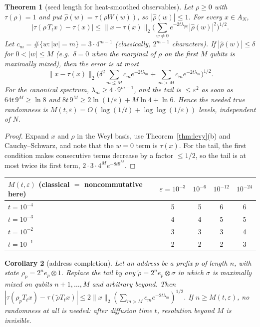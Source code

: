 \documentclass[11pt]{article}
\newtheorem{theorem}{Theorem}[section]
\newtheorem{corollary}[theorem]{Corollary}
\theoremstyle{definition}
\theoremstyle{remark}
\newcommand{\dep}[1]{|#1|}
\begin{document}
\begin{theorem}[seed length for heat-smoothed observables]\label{thm:seedlen}
Let $\rho\ge0$ with $\tau(\rho)=1$ and put $\hat\rho(w)=\tau(\rho W(w))$, so $|\hat\rho(w)|\le1$. For every $x\in A_N$,
\[|\tau(\rho\,T_tx)-\tau(x)|\le\|x-\tau(x)\|_2\Big(\sum_{w\ne0}e^{-2t\lambda_{\dep w}}|\hat\rho(w)|^2\Big)^{1/2}.\]
Let $c_m=\#\{w:\dep w=m\}=3\cdot4^{m-1}$ (classically, $2^{m-1}$ characters). If $|\hat\rho(w)|\le\delta$ for $0<\dep w\le M$ (e.g.\ $\delta=0$ when the marginal of $\rho$ on the first $M$ qubits is maximally mixed), then the error is at most
\[\|x-\tau(x)\|_2\Big(\delta^2\textstyle\sum_{m\le M}c_me^{-2t\lambda_m}+\sum_{m>M}c_me^{-2t\lambda_m}\Big)^{1/2}.\]
For the canonical spectrum, $\lambda_m\ge4\cdot9^{m-1}$, and the tail is $\le\varepsilon^2$ as soon as $64t\,9^M\ge\ln8$ and $8t\,9^M\ge2\ln(1/\varepsilon)+M\ln4+\ln6$. Hence the needed true randomness is $M(t,\varepsilon)=O(\log(1/t)+\log\log(1/\varepsilon))$ levels, \emph{independent of $N$}.
\end{theorem}

\begin{proof}
Expand $x$ and $\rho$ in the Weyl basis, use Theorem~\ref{thm:levy}(b) and Cauchy--Schwarz, and note that the $w=0$ term is $\tau(x)$. For the tail, the first condition makes consecutive terms decrease by a factor $\le1/2$, so the tail is at most twice its first term, $2\cdot3\cdot4^Me^{-8t9^M}$.
\end{proof}

\begin{center}
\begin{tabular}{lcccc}
\toprule
$M(t,\varepsilon)$ (classical $=$ noncommutative here) & $\varepsilon=10^{-3}$ & $10^{-6}$ & $10^{-12}$ & $10^{-24}$\\
\midrule
$t=10^{-4}$ & 5 & 5 & 6 & 6\\
$t=10^{-3}$ & 4 & 4 & 5 & 5\\
$t=10^{-2}$ & 3 & 3 & 3 & 4\\
$t=10^{-1}$ & 2 & 2 & 2 & 3\\
\bottomrule
\end{tabular}
\end{center}

\begin{corollary}[address completion]
Let an \emph{address} be a prefix $p$ of length $n$, with state $\rho_p=2^ne_p\otimes1$. Replace the tail by any $\tilde\rho=2^ne_p\otimes\sigma$ in which $\sigma$ is maximally mixed on qubits $n+1,\dots,M$ and arbitrary beyond. Then $|\tau(\rho_pT_tx)-\tau(\tilde\rho T_tx)|\le2\|x\|_2(\sum_{m>M}c_me^{-2t\lambda_m})^{1/2}$. If $n\ge M(t,\varepsilon)$, no randomness at all is needed: after diffusion time $t$, resolution beyond $M$ is invisible.
\end{corollary}
\end{document}
